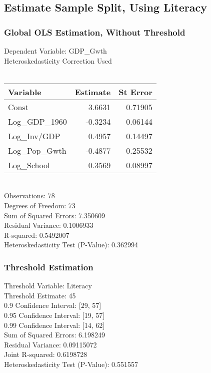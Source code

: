 \subsection{Estimate Sample Split, Using Literacy} 

\subsubsection{Global OLS Estimation, Without Threshold} 
Dependent Variable:      GDP\_Gwth \\
Heteroskedasticity Correction Used \\\\
\begin{tabular}{l*{2}{r}}
\toprule
Variable    &   Estimate     &   St Error \\
\midrule 
Const   &    3.6631   &   0.71905 \\
Log\_GDP\_1960   &   -0.3234   &   0.06144 \\
Log\_Inv/GDP   &    0.4957   &   0.14497 \\
Log\_Pop\_Gwth   &   -0.4877   &   0.25532 \\
Log\_School   &    0.3569   &   0.08997 \\
\bottomrule
\end{tabular}
\bigskip \\
Observations:                       78 \\
Degrees of Freedom:                 73 \\
Sum of Squared Errors:              7.350609 \\
Residual Variance:                  0.1006933 \\
R-squared:                          0.5492007 \\
Heteroskedasticity Test (P-Value):  0.362994 \\

\subsubsection{Threshold Estimation} 
Threshold Variable:                 Literacy \\
Threshold Estimate:                 45 \\
0.9 Confidence Interval:           [29, 57] \\
0.95 Confidence Interval:           [19, 57] \\
0.99 Confidence Interval:           [14, 62] \\
Sum of Squared Errors:              6.198249 \\
Residual Variance:                  0.09115072 \\
Joint R-squared:                    0.6198728 \\
Heteroskedasticity Test (P-Value):  0.551557 \\

